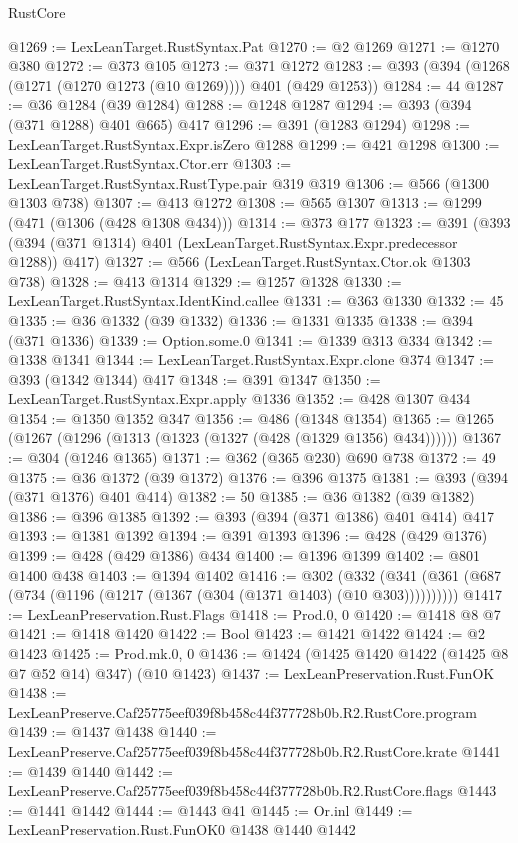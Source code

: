 \begin{lexlean}{RustCore}
\begin{coremodule}
@1269 := LexLeanTarget.RustSyntax.Pat
@1270 := @2 @1269
@1271 := @1270 @380
@1272 := @373 @105
@1273 := @371 @1272
@1283 := @393 (@394 (@1268 (@1271 (@1270 @1273 (@10 @1269)))) @401 (@429 @1253))
@1284 := 44
@1287 := @36 @1284 (@39 @1284)
@1288 := @1248 @1287
@1294 := @393 (@394 (@371 @1288) @401 @665) @417
@1296 := @391 (@1283 @1294)
@1298 := LexLeanTarget.RustSyntax.Expr.isZero @1288
@1299 := @421 @1298
@1300 := LexLeanTarget.RustSyntax.Ctor.err
@1303 := LexLeanTarget.RustSyntax.RustType.pair @319 @319
@1306 := @566 (@1300 @1303 @738)
@1307 := @413 @1272
@1308 := @565 @1307
@1313 := @1299 (@471 (@1306 (@428 @1308 @434)))
@1314 := @373 @177
@1323 := @391 (@393 (@394 (@371 @1314) @401 (LexLeanTarget.RustSyntax.Expr.predecessor @1288)) @417)
@1327 := @566 (LexLeanTarget.RustSyntax.Ctor.ok @1303 @738)
@1328 := @413 @1314
@1329 := @1257 @1328
@1330 := LexLeanTarget.RustSyntax.IdentKind.callee
@1331 := @363 @1330
@1332 := 45
@1335 := @36 @1332 (@39 @1332)
@1336 := @1331 @1335
@1338 := @394 (@371 @1336)
@1339 := Option.some.{0}
@1341 := @1339 @313 @334
@1342 := @1338 @1341
@1344 := LexLeanTarget.RustSyntax.Expr.clone @374
@1347 := @393 (@1342 @1344) @417
@1348 := @391 @1347
@1350 := LexLeanTarget.RustSyntax.Expr.apply @1336
@1352 := @428 @1307 @434
@1354 := @1350 @1352 @347
@1356 := @486 (@1348 @1354)
@1365 := @1265 (@1267 (@1296 (@1313 (@1323 (@1327 (@428 (@1329 @1356) @434))))))
@1367 := @304 (@1246 @1365)
@1371 := @362 (@365 @230) @690 @738
@1372 := 49
@1375 := @36 @1372 (@39 @1372)
@1376 := @396 @1375
@1381 := @393 (@394 (@371 @1376) @401 @414)
@1382 := 50
@1385 := @36 @1382 (@39 @1382)
@1386 := @396 @1385
@1392 := @393 (@394 (@371 @1386) @401 @414) @417
@1393 := @1381 @1392
@1394 := @391 @1393
@1396 := @428 (@429 @1376)
@1399 := @428 (@429 @1386) @434
@1400 := @1396 @1399
@1402 := @801 @1400 @438
@1403 := @1394 @1402
@1416 := @302
    (@332 (@341 (@361 (@687 (@734 (@1196 (@1217 (@1367 (@304 (@1371 @1403) (@10 @303))))))))))
@1417 := LexLeanPreservation.Rust.Flags
@1418 := Prod.{0, 0}
@1420 := @1418 @8 @7
@1421 := @1418 @1420
@1422 := Bool
@1423 := @1421 @1422
@1424 := @2 @1423
@1425 := Prod.mk.{0, 0}
@1436 := @1424 (@1425 @1420 @1422 (@1425 @8 @7 @52 @14) @347) (@10 @1423)
@1437 := LexLeanPreservation.Rust.FunOK
@1438 := LexLeanPreserve.Caf25775eef039f8b458c44f377728b0b.R2.RustCore.program
@1439 := @1437 @1438
@1440 := LexLeanPreserve.Caf25775eef039f8b458c44f377728b0b.R2.RustCore.krate
@1441 := @1439 @1440
@1442 := LexLeanPreserve.Caf25775eef039f8b458c44f377728b0b.R2.RustCore.flags
@1443 := @1441 @1442
@1444 := @1443 @41
@1445 := Or.inl
@1449 := LexLeanPreservation.Rust.FunOK0 @1438 @1440 @1442

\end{coremodule}
\end{lexlean}
